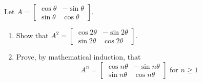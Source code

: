 \documentclass[12pt,letterpaper]{hmcpset}
\begin{document}
\begin{solution}
\vfill
\end{solution}
\newpage

\begin{problem}[3.1.38]

Let $A = \begin{bmatrix}
		\cos{\theta} & -\sin{\theta}\\
		\sin{\theta} & \cos{\theta}
	\end{bmatrix}$.\\
	\begin{enumerate}
		\item
			Show that $A^2 = \begin{bmatrix}
				\cos{2\theta} & -\sin{2\theta}\\
				\sin{2\theta} & \cos{2\theta}
				\end{bmatrix}$.
		\item
			Prove, by mathematical induction, that $$A^n = \begin{bmatrix}
				\cos{n\theta} & -\sin{n\theta}\\
				\sin{n\theta} & \cos{n\theta}
				\end{bmatrix} \text{ for } n \geq 1$$
	\end{enumerate}
\end{problem}

\begin{solution}
\vfill
\end{solution}
\end{document}
